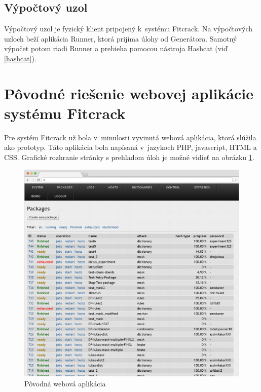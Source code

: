 \documentclass[zadani,slovak]{fitthesis}
\begin{document}
\subsection{Výpočtový uzol}
Výpočtový uzol je fyzický klient pripojený k~systému Fitcrack. Na výpočtových uzloch beží aplikácia Runner, ktorá prijíma úlohy od Generátora. Samotný výpočet potom riadi Runner a prebieha pomocou nástroja Hashcat (viď \ref{hashcat}).



\section{Pôvodné riešenie webovej aplikácie systému Fitcrack}
Pre systém Fitcrack už bola v~minulosti vyvinutá webová aplikácia, ktorá slúžila ako prototyp. Táto aplikácia bola napísaná v~jazykoch PHP, javascript, HTML a CSS. Grafické rozhranie stránky s prehľadom úloh je možné vidieť na obrázku \ref{fig:oldFitcrack}.
\begin{figure}[H]
    \centering
    \includegraphics[scale=0.3]{obrazky/oldWebadminFrame.PNG}
    \caption{Pôvodná webová aplikácia}
    \label{fig:oldFitcrack}
\end{figure}
\end{document}

